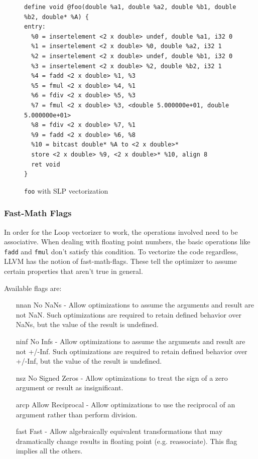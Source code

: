 \documentclass[a4paper,bibliography=totocnumbered,parskip,headsepline]{scrbook}
\begin{document}
\begin{figure}
\begin{lstlisting}
define void @foo(double %a1, double %a2, double %b1, double %b2, double* %A) {
entry:
  %0 = insertelement <2 x double> undef, double %a1, i32 0
  %1 = insertelement <2 x double> %0, double %a2, i32 1
  %2 = insertelement <2 x double> undef, double %b1, i32 0
  %3 = insertelement <2 x double> %2, double %b2, i32 1
  %4 = fadd <2 x double> %1, %3
  %5 = fmul <2 x double> %4, %1
  %6 = fdiv <2 x double> %5, %3
  %7 = fmul <2 x double> %3, <double 5.000000e+01, double 5.000000e+01>
  %8 = fdiv <2 x double> %7, %1
  %9 = fadd <2 x double> %6, %8
  %10 = bitcast double* %A to <2 x double>*
  store <2 x double> %9, <2 x double>* %10, align 8
  ret void
}
\end{lstlisting}
\caption{\lstinline{foo} with SLP vectorization}
\label{fig:slpll2}
\end{figure}

\subsubsection{Fast-Math Flags}
In order for the Loop vectorizer to work, the operations involved need to be associative.
When dealing with floating point numbers, the basic operations like \lstinline{fadd} and \lstinline{fmul} don't satisfy this condition.
To vectorize the code regardless, LLVM has the notion of fast-math-flags.
These tell the optimizer to assume certain properties that aren't true in general.

Available flags are\cite{llvmref}:
\begin{itemize}
\item[nnan] No NaNs - Allow optimizations to assume the arguments and result are not NaN. Such optimizations are required to retain defined behavior over NaNs, but the value of the result is undefined.
\item[ninf] No Infs - Allow optimizations to assume the arguments and result are not +/-Inf. Such optimizations are required to retain defined behavior over +/-Inf, but the value of the result is undefined.
\item[nsz] No Signed Zeros - Allow optimizations to treat the sign of a zero argument or result as insignificant.
\item[arcp] Allow Reciprocal - Allow optimizations to use the reciprocal of an argument rather than perform division.
\item[fast] Fast - Allow algebraically equivalent transformations that may dramatically change results in floating point (e.g. reassociate). This flag implies all the others.
\end{itemize}
\end{document}
